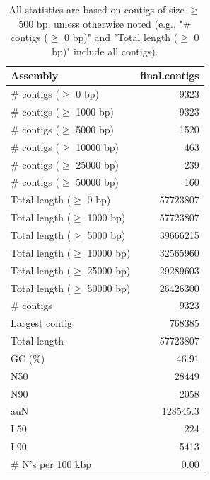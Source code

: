 \documentclass[12pt,a4paper]{article}
\begin{document}
\begin{table}[ht]
\begin{center}
\caption{All statistics are based on contigs of size $\geq$ 500 bp, unless otherwise noted (e.g., "\# contigs ($\geq$ 0 bp)" and "Total length ($\geq$ 0 bp)" include all contigs).}
\begin{tabular}{|l*{1}{|r}|}
\hline
Assembly & final.contigs \\ \hline
\# contigs ($\geq$ 0 bp) & 9323 \\ \hline
\# contigs ($\geq$ 1000 bp) & 9323 \\ \hline
\# contigs ($\geq$ 5000 bp) & 1520 \\ \hline
\# contigs ($\geq$ 10000 bp) & 463 \\ \hline
\# contigs ($\geq$ 25000 bp) & 239 \\ \hline
\# contigs ($\geq$ 50000 bp) & 160 \\ \hline
Total length ($\geq$ 0 bp) & 57723807 \\ \hline
Total length ($\geq$ 1000 bp) & 57723807 \\ \hline
Total length ($\geq$ 5000 bp) & 39666215 \\ \hline
Total length ($\geq$ 10000 bp) & 32565960 \\ \hline
Total length ($\geq$ 25000 bp) & 29289603 \\ \hline
Total length ($\geq$ 50000 bp) & 26426300 \\ \hline
\# contigs & 9323 \\ \hline
Largest contig & 768385 \\ \hline
Total length & 57723807 \\ \hline
GC (\%) & 46.91 \\ \hline
N50 & 28449 \\ \hline
N90 & 2058 \\ \hline
auN & 128545.3 \\ \hline
L50 & 224 \\ \hline
L90 & 5413 \\ \hline
\# N's per 100 kbp & 0.00 \\ \hline
\end{tabular}
\end{center}
\end{table}
\end{document}
